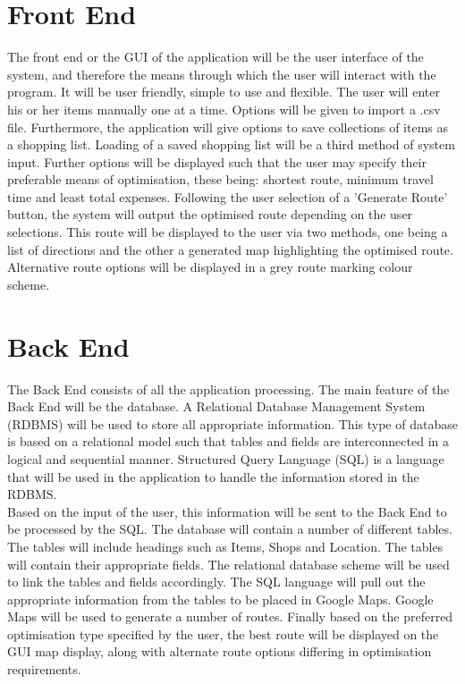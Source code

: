 \documentclass[10pt, a4paper, onecolumn]{scrartcl}
\begin{document}
	\section{Front End}
		
		The front end or the GUI of the application will be the user interface of the system, and therefore the means through which the user will interact with the program. It will be user friendly, simple to use and flexible. The user will enter his or her items manually one at a time. Options will be given to import a .csv file. Furthermore, the application will give options to save collections of items as a shopping list. Loading of a saved shopping list will be a third method of system input. Further options will be displayed such that the user may specify their preferable means of optimisation, these being: shortest route, minimum travel time and least total expenses. Following the user selection of a 'Generate Route' button, the system will output the optimised route depending on the user selections. This route will be displayed to the user via two methods, one being a list of directions and the other a generated map highlighting the optimised route. Alternative route options will be displayed in a grey route marking colour scheme.  
	
	\section{Back End}
	
		The Back End consists of all the application processing. The main feature of the Back End will be the database. A Relational Database Management System (RDBMS) will be used to store all appropriate information. This type of database is based on a relational model such that tables and fields are interconnected in a logical and sequential manner. Structured Query Language (SQL) is a language that will be used in the application to handle the information stored in the RDBMS. \\
	
		Based on the input of the user, this information will be sent to the Back End to be processed by the SQL. The database will contain a number of different tables. The tables will include headings such as Items,  Shops and Location. The tables will contain their appropriate fields. The relational database scheme will be used to link the tables and fields accordingly. The SQL language will pull out the appropriate information from the tables to be placed in Google Maps. Google Maps will be used to generate a number of routes. Finally based on the preferred optimisation type specified by the user, the best route will be displayed on the GUI map display, along with alternate route options differing in optimisation requirements. 
	
\end{document}
